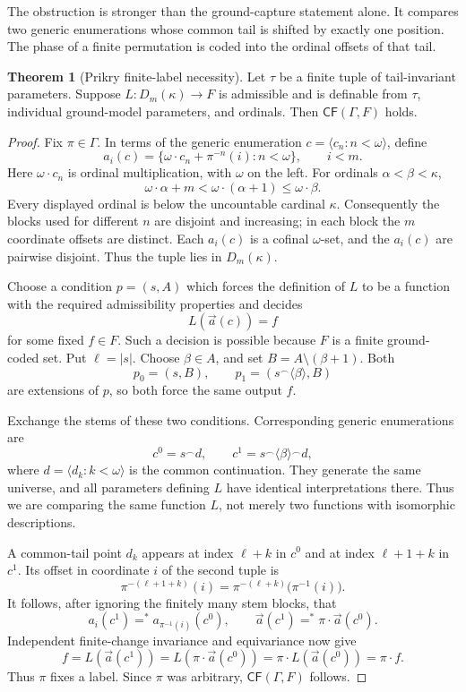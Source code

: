 \documentclass[11pt,letterpaper]{article}
\theoremstyle{definition}
\newtheorem{theorem}[definition]{Theorem}
\numberwithin{equation}{section}
\newcommand{\CF}{\mathsf{CF}}
\newcommand{\concat}{\mathbin{{}^\frown}}
\begin{document}
The obstruction is stronger than the ground-capture statement alone. It compares two generic enumerations whose common tail is shifted by exactly one position. The phase of a finite permutation is coded into the ordinal offsets of that tail.

\begin{theorem}[Prikry finite-label necessity]\label{thm:necessity}
Let $\tau$ be a finite tuple of tail-invariant parameters. Suppose $L:D_m(\kappa)\to F$ is admissible and is definable from $\tau$, individual ground-model parameters, and ordinals. Then $\CF(\Gamma,F)$ holds.
\end{theorem}
\begin{proof}
Fix $\pi\in\Gamma$. In terms of the generic enumeration $c=\langle c_n:n<\omega\rangle$, define
\begin{equation}\label{eq:phase}
 a_i(c)=\{\omega\cdot c_n+\pi^{-n}(i):n<\omega\},\qquad i<m.
\end{equation}
Here $\omega\cdot c_n$ is ordinal multiplication, with $\omega$ on the left. For ordinals $\alpha<\beta<\kappa$,
\[
 \omega\cdot\alpha+m<\omega\cdot(\alpha+1)\leq\omega\cdot\beta.
\]
Every displayed ordinal is below the uncountable cardinal $\kappa$. Consequently the blocks used for different $n$ are disjoint and increasing; in each block the $m$ coordinate offsets are distinct. Each $a_i(c)$ is a cofinal $\omega$-set, and the $a_i(c)$ are pairwise disjoint. Thus the tuple lies in $D_m(\kappa)$.

Choose a condition $p=(s,A)$ which forces the definition of $L$ to be a function with the required admissibility properties and decides
\[
 L(\vec a(c))=f
\]
for some fixed $f\in F$. Such a decision is possible because $F$ is a finite ground-coded set. Put $\ell=|s|$. Choose $\beta\in A$, and set $B=A\setminus(\beta+1)$. Both
\[
 p_0=(s,B),\qquad p_1=(s\concat\langle\beta\rangle,B)
\]
are extensions of $p$, so both force the same output $f$.

Exchange the stems of these two conditions. Corresponding generic enumerations are
\[
 c^0=s\concat d,\qquad
 c^1=s\concat\langle\beta\rangle\concat d,
\]
where $d=\langle d_k:k<\omega\rangle$ is the common continuation. They generate the same universe, and all parameters defining $L$ have identical interpretations there. Thus we are comparing the same function $L$, not merely two functions with isomorphic descriptions.

A common-tail point $d_k$ appears at index $\ell+k$ in $c^0$ and at index $\ell+1+k$ in $c^1$. Its offset in coordinate $i$ of the second tuple is
\[
 \pi^{-(\ell+1+k)}(i)
   =\pi^{-(\ell+k)}\bigl(\pi^{-1}(i)\bigr).
\]
It follows, after ignoring the finitely many stem blocks, that
\begin{equation}\label{eq:phase-shift}
 a_i(c^1)=^*a_{\pi^{-1}(i)}(c^0),\qquad
 \vec a(c^1)=^*\pi\cdot\vec a(c^0).
\end{equation}
Independent finite-change invariance and equivariance now give
\[
 f=L(\vec a(c^1))
   =L(\pi\cdot\vec a(c^0))
   =\pi\cdot L(\vec a(c^0))
   =\pi\cdot f.
\]
Thus $\pi$ fixes a label. Since $\pi$ was arbitrary, $\CF(\Gamma,F)$ follows.
\end{proof}
\end{document}
